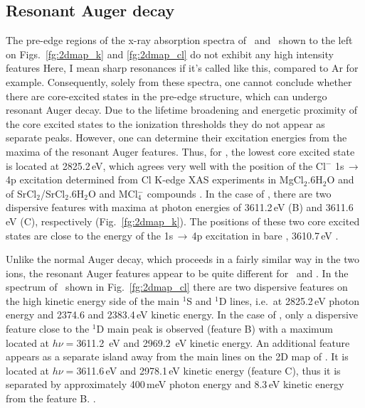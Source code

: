 \subsection{Resonant Auger decay} \label{ssec:ra}

The pre-edge regions of the x-ray absorption spectra of \ki~and \cli~shown to the left on Figs.\ \ref{fg:2dmap_k} and \ref{fg:2dmap_cl} do not exhibit any high intensity features {\color{red}Here, I mean sharp resonances if it's called like this, compared to Ar for example}. Consequently, solely from these spectra, one cannot conclude whether there are core-excited states in the pre-edge structure, which can undergo resonant Auger decay. Due to the lifetime broadening and energetic proximity of the core excited states to the ionization thresholds they do not appear as separate peaks. However, one can determine their excitation energies from the maxima of the resonant Auger features. Thus, for \cli, the lowest core excited state is located at 2825.2\,eV, which agrees very well with the position of the Cl$^{-}$ 1s$\,\rightarrow\,$4p excitation determined from Cl K-edge XAS experiments in MgCl$_2$.6H$_2$O and of SrCl$_2$/SrCl$_2$.6H$_2$O \citep{sugiura82:681} and MCl$_{4}^{-}$ compounds \citep{shadle95:2259}. In the case of \ki, there are two dispersive features with maxima at photon energies of 3611.2\,eV (B) and 3611.6\,eV (C), respectively (Fig.\ \ref{fg:2dmap_k}). The positions of these two core excited states are close to the energy of the 1s$\,\rightarrow\,$4p excitation in bare \ki, 3610.7\,eV \citep{hertlein06:062715}.


Unlike the normal Auger decay, which proceeds in a fairly similar way in the two ions, the resonant Auger features appear to be quite different for \cli~and \ki. In the spectrum of \cli~shown in Fig.\ \ref{fg:2dmap_cl} there are two dispersive features on the high kinetic energy side of the main $^1$S and $^1$D lines, i.e.\ at 2825.2\,eV photon energy and 2374.6 and 2383.4\,eV kinetic energy. In the case of \ki, only a dispersive feature close to the $^1$D main peak is observed (feature B) with a maximum located at $h\nu = $3611.2 \,eV and 2969.2 \,eV kinetic energy. An additional feature appears as a separate island away from the main lines on the 2D map of \ki. It is located at $h\nu = $3611.6\,eV and 2978.1\,eV kinetic energy (feature C), thus it is separated by approximately 400\,meV photon energy and 8.3\,eV kinetic energy from the feature B. .


